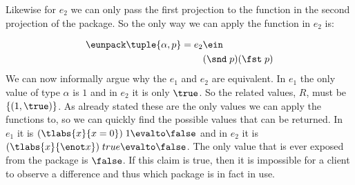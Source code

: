 Likewise for $e_2$ we can only pass the first projection to the function in the second projection of the package. So the only way we can apply the function in  $e_2$ is:

\begin{align*}
  \eunpack \tuple{\alpha,p} = e_2 & \ein \\
  & (\snd \; p)(\fst \; p)
\end{align*}
We can now informally argue why the $e_1$ and $e_2$ are equivalent. In $e_1$ the only value of type $\alpha$ is $1$ and in $e_2$ it is only $\true$. So the related values, $R$, must be $\{(1,\true)\}$. As  already stated these are the only values we can apply the functions to, so we can quickly find the possible values that can be returned. In $e_1$ it is $(\tlabs{x}{x=0})\; 1 \evalto \false$ and in $e_2$ it is $(\tlabs{x}{\enot x })\; true \evalto \false$. The only value that is ever exposed from the package is $\false$. If this claim is true, then it is impossible for a client to observe a difference and thus which package is in fact in use. 

